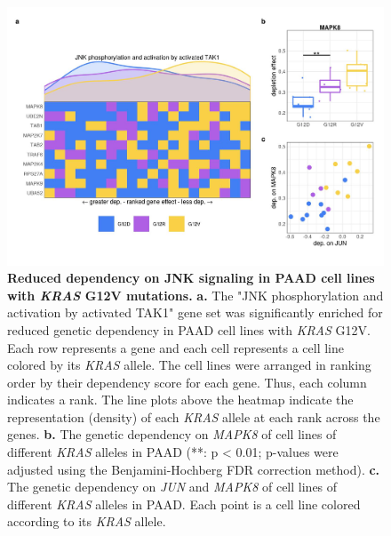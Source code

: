 \documentclass[english, 10pt, letterpaper]{article}
\newcommand{\KRAS}{\emph{KRAS}}
\begin{document}
\begin{figure}
\centering
\includegraphics[width=\textwidth]{figures/SuppFigure_14.jpeg}
\caption{
    \textbf{Reduced dependency on JNK signaling in PAAD cell lines with \KRAS{} G12V mutations.}
    \textbf{a.} The "JNK phosphorylation and activation by activated TAK1" gene set was significantly enriched for reduced genetic dependency in PAAD cell lines with \KRAS{} G12V. Each row represents a gene and each cell represents a cell line colored by its \KRAS{} allele. The cell lines were arranged in ranking order by their dependency score for each gene. Thus, each column indicates a rank. The line plots above the heatmap indicate the representation (density) of each \KRAS{} allele at each rank across the genes.
    \textbf{b.} The genetic dependency on \emph{MAPK8} of cell lines of different \KRAS{} alleles in PAAD (**: p < 0.01; p-values were adjusted using the Benjamini-Hochberg FDR correction method).
    \textbf{c.} The genetic dependency on \emph{JUN} and \emph{MAPK8} of cell lines of different \KRAS{} alleles in PAAD. Each point is a cell line colored according to its \KRAS{} allele.
}
\label{sfig:paad-dependency-JUN}
\end{figure}
\end{document}
